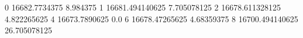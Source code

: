 0 16682.7734375 8.984375
1 16681.494140625 7.705078125
2 16678.611328125 4.822265625
4 16673.7890625 0.0
6 16678.47265625 4.68359375
8 16700.494140625 26.705078125
